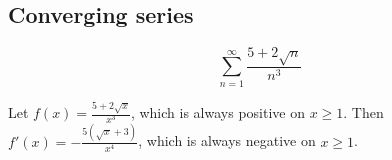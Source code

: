 \subsection{Converging series}
\begin{ex}\label{ex:convcomp}
  \[ \sum_{n=1}^{\infty} \frac{5+2\sqrt n}{n^3} \]
  \begin{sol}

    Let $f(x)=\frac{5+2\sqrt{x}}{x^3}$, which is always positive on $x\geq 1$.
    Then $f'(x) = -\frac{5(\sqrt{x}+3)}{x^4}$, which is always negative on $x
    \geq 1$.
    \begin{figure}[H]
      \begin{center}
      \end{center}
    \end{figure}

\end{sol}
\end{ex}
